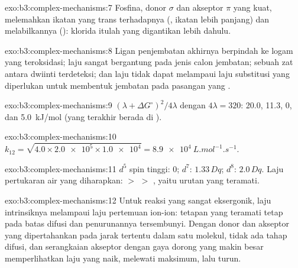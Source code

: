 \begin{solution}{exo:b3:complex-mechanisms:7}
Fosfina, donor $\sigma$ dan akseptor $\pi$ yang kuat, melemahkan ikatan yang trans terhadapnya (, ikatan lebih panjang) dan melabilkannya (): klorida itulah yang
digantikan lebih dahulu.
\end{solution}

\begin{solution}{exo:b3:complex-mechanisms:8}
Ligan penjembatan akhirnya berpindah ke logam yang teroksidasi; laju sangat
bergantung pada jenis calon jembatan; sebuah zat antara dwiinti terdeteksi; dan
laju tidak dapat melampaui laju substitusi yang diperlukan untuk membentuk
jembatan pada pasangan yang .
\end{solution}

\begin{solution}{exo:b3:complex-mechanisms:9}
$(\lambda + \Delta G^\circ)^2/4\lambda$ dengan $4\lambda = 320$: 20.0, 11.3, 0, dan \qty{5.0}{kJ/mol} (yang terakhir berada di ).
\end{solution}

\begin{solution}{exo:b3:complex-mechanisms:10}
$k_{12} = \sqrt{4.0 \times \num{2.0e5} \times \num{1.0e4}} = \qty{8.9e4}{L.mol^{-1}.s^{-1}}$.
\end{solution}

\begin{solution}{exo:b3:complex-mechanisms:11}
$d^5$ spin tinggi: 0; $d^7$: $1.33\,Dq$; $d^8$: $2.0\,Dq$. Laju pertukaran air yang diharapkan:  $>$  $>$
, yaitu urutan yang teramati.
\end{solution}

\begin{solution}{exo:b3:complex-mechanisms:12}
Untuk reaksi yang sangat eksergonik, laju intrinsiknya melampaui laju pertemuan
ion-ion: tetapan yang teramati tetap pada batas difusi dan penurunannya
tersembunyi. Dengan donor dan akseptor yang dipertahankan pada jarak tertentu
dalam satu molekul, tidak ada tahap difusi, dan serangkaian akseptor dengan
gaya dorong yang makin besar memperlihatkan laju yang naik, melewati maksimum,
lalu turun.
\end{solution}

